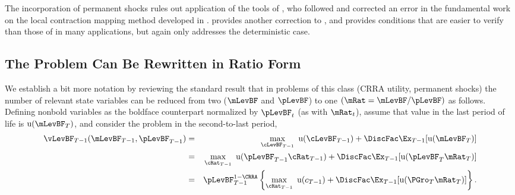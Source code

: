 \documentclass[titlepage]{\econtex}\providecommand{\texname}{BufferStockTheory}%
\begin{document}
The incorporation of permanent shocks rules out application of the tools of \cite{mnUnique}, who followed and corrected an error in the fundamental work on the local contraction mapping method developed in \cite{rrExistence}.  \cite{mvExistence} provides another correction to \cite{rrExistence}, and provides conditions that are easier to verify than those of \cite{mvExistence} in many applications, but again only addresses the deterministic case.  

\hypertarget{The-Problem-Can-Be-Rewritten-in-Ratio-Form}{}
\subsection{The Problem Can Be Rewritten in Ratio Form}

\label{subsec:ratio}

We establish a bit more notation by reviewing the standard result that in problems of this class (CRRA utility, permanent shocks) the number of relevant state variables can be reduced from two ($\mLevBF$ and $\pLevBF$) to one $(\mRat = \mLevBF/\pLevBF)$ as follows.  Defining nonbold variables as the boldface counterpart normalized by $\pLevBF_{t}$ (as with $\mRat_{t}$), assume that value in the last period of life is $\util(\mLevBF_{T})$, and consider the problem in the second-to-last period,
\begin{eqnarray}
\vLevBF_{T-1}(\mLevBF_{T-1},\pLevBF_{T-1}) &=&
\max_{\cLevBF_{T-1}}~ \util(\cLevBF_{T-1}) +\DiscFac \Ex_{T-1} [ \util(\mLevBF_{T})]
\notag \\
& = &  \max_{\cRat_{T-1}}~
\util(\pLevBF_{T-1}\cRat_{T-1}) + \DiscFac  \Ex_{T-1} [\util(\pLevBF_{T}{\mRat}
_{T})]  \notag \\
& = & \pLevBF_{T-1}^{1-\CRRA}
\left\{\max_{\cRat_{T-1}}~ \util(c_{T-1}) + \DiscFac \Ex_{T-1} [ \util( {\PGro}_{T}
{\mRat}_{T}) ] \right\}  . \label{eq:vBold}
\end{eqnarray}

\end{document}
